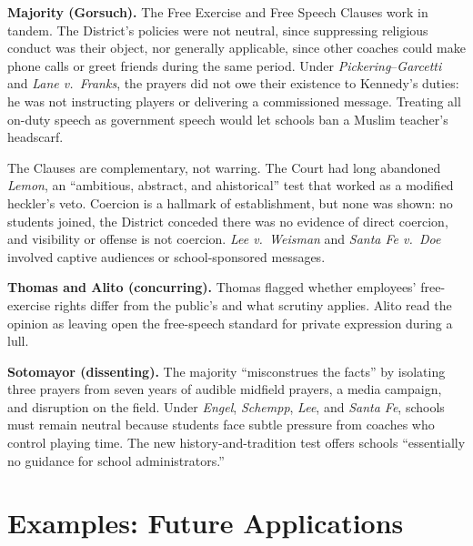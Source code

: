 \documentclass[12pt]{article}
\begin{document}
\textbf{Majority (Gorsuch).} The Free Exercise and Free Speech Clauses work in tandem. The District's policies were not neutral, since suppressing religious conduct was their object, nor generally applicable, since other coaches could make phone calls or greet friends during the same period. Under \textit{Pickering}--\textit{Garcetti} and \textit{Lane v.\ Franks}, the prayers did not owe their existence to Kennedy's duties: he was not instructing players or delivering a commissioned message. Treating all on-duty speech as government speech would let schools ban a Muslim teacher's headscarf.

The Clauses are complementary, not warring. The Court had long abandoned \textit{Lemon}, an ``ambitious, abstract, and ahistorical'' test that worked as a modified heckler's veto. Coercion is a hallmark of establishment, but none was shown: no students joined, the District conceded there was no evidence of direct coercion, and visibility or offense is not coercion. \textit{Lee v.\ Weisman} and \textit{Santa Fe v.\ Doe} involved captive audiences or school-sponsored messages.

\textbf{Thomas and Alito (concurring).} Thomas flagged whether employees' free-exercise rights differ from the public's and what scrutiny applies. Alito read the opinion as leaving open the free-speech standard for private expression during a lull.

\textbf{Sotomayor (dissenting).} The majority ``misconstrues the facts'' by isolating three prayers from seven years of audible midfield prayers, a media campaign, and disruption on the field. Under \textit{Engel}, \textit{Schempp}, \textit{Lee}, and \textit{Santa Fe}, schools must remain neutral because students face subtle pressure from coaches who control playing time. The new history-and-tradition test offers schools ``essentially no guidance for school administrators.''

\section{Examples: Future Applications}
\end{document}
